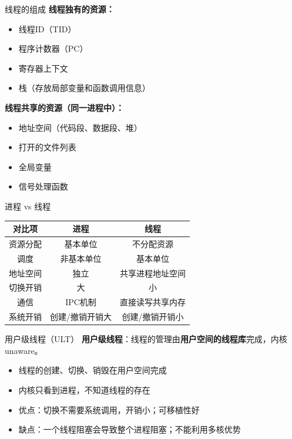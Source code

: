 \documentclass[10pt, aspectratio=169]{beamer}
\begin{document}
\begin{frame}{线程的组成}
    \textbf{线程独有的资源：}
    \begin{itemize}
        \item 线程ID（TID）
        \item 程序计数器（PC）
        \item 寄存器上下文
        \item 栈（存放局部变量和函数调用信息）
    \end{itemize}
    \vspace{0.5em}
    \textbf{线程共享的资源（同一进程中）：}
    \begin{itemize}
        \item 地址空间（代码段、数据段、堆）
        \item 打开的文件列表
        \item 全局变量
        \item 信号处理函数
    \end{itemize}
\end{frame}

\begin{frame}{进程 vs 线程}
    \begin{tabular}{|c|c|c|}
        \hline
        对比项 & 进程 & 线程 \\
        \hline
        资源分配 & 基本单位 & 不分配资源 \\
        调度 & 非基本单位 & 基本单位 \\
        地址空间 & 独立 & 共享进程地址空间 \\
        切换开销 & 大 & 小 \\
        通信 & IPC机制 & 直接读写共享内存 \\
        系统开销 & 创建/撤销开销大 & 创建/撤销开销小 \\
        \hline
    \end{tabular}
\end{frame}

\begin{frame}{用户级线程（ULT）}
    \textbf{用户级线程}：线程的管理由\textbf{用户空间的线程库}完成，内核 unaware。

    \begin{itemize}
        \item 线程的创建、切换、销毁在用户空间完成
        \item 内核只看到进程，不知道线程的存在
        \item 优点：切换不需要系统调用，开销小；可移植性好
        \item 缺点：一个线程阻塞会导致整个进程阻塞；不能利用多核优势
    \end{itemize}
\end{frame}
\end{document}
